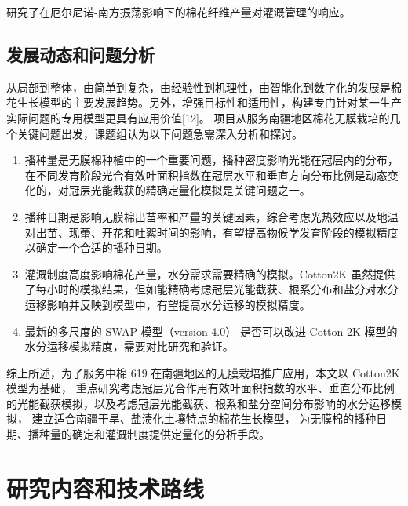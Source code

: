  研究了在厄尔尼诺-南方振荡影响下的棉花纤维产量对灌溉管理的响应。


\subsection{发展动态和问题分析}
从局部到整体，由简单到复杂，由经验性到机理性，由智能化到数字化的发展是棉花生长模型的主要发展趋势。另外，增强目标性和适用性，构建专门针对某一生产实际问题的专用模型更具有应用价值[12]。
项目从服务南疆地区棉花无膜栽培的几个关键问题出发，课题组认为以下问题急需深入分析和探讨。

\begin{enumerate}
    \item 播种量是无膜棉种植中的一个重要问题，播种密度影响光能在冠层内的分布，在不同发育阶段光合有效叶面积指数在冠层水平和垂直方向分布比例是动态变化的，对冠层光能截获的精确定量化模拟是关键问题之一。
    \item 播种日期是影响无膜棉出苗率和产量的关键因素，综合考虑光热效应以及地温对出苗、现蕾、开花和吐絮时间的影响，有望提高物候学发育阶段的模拟精度以确定一个合适的播种日期。
    \item 灌溉制度高度影响棉花产量，水分需求需要精确的模拟。Cotton2K 虽然提供了每小时的模拟结果，但如能精确考虑冠层光能截获、根系分布和盐分对水分运移影响并反映到模型中，有望提高水分运移的模拟精度。
    \item 最新的多尺度的 SWAP 模型（version 4.0）\cite{swap2021} 是否可以改进 Cotton 2K 模型的水分运移模拟精度，需要对比研究和验证。
\end{enumerate}

综上所述，为了服务中棉 619 在南疆地区的无膜栽培推广应用，本文以 Cotton2K 模型为基础，
重点研究考虑冠层光合作用有效叶面积指数的水平、垂直分布比例的光能截获模拟，以及考虑冠层光能截获、根系和盐分空间分布影响的水分运移模拟，
建立适合南疆干旱、盐渍化土壤特点的棉花生长模型，
为无膜棉的播种日期、播种量的确定和灌溉制度提供定量化的分析手段。

\section{研究内容和技术路线}

